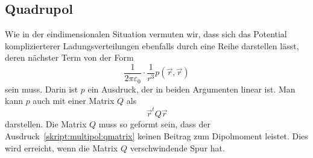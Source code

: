 \subsection{Quadrupol}
Wie in der eindimensionalen Situation vermuten wir, dass sich
das Potential komplizierterer Ladungsverteilungen ebenfalls durch
eine Reihe darstellen lässt, deren nächster Term von der Form
\[
\frac1{2\pi\varepsilon_0}\cdot\frac{1}{r^3} p(\vec{r},\vec{r})
\]
sein muss.
Darin ist $p$ ein Ausdruck, der in beiden Argumenten linear ist.
Man kann $p$ auch mit einer Matrix $Q$ als
\begin{equation}
\vec{r}^t Q\vec{r}
\label{skript:multipol:qmatrix}
\end{equation}
darstellen.
Die Matrix $Q$ muss so geformt sein, dass der
Ausdruck~\eqref{skript:multipol:qmatrix}
keinen Beitrag zum Dipolmoment leistet.
Dies wird erreicht, wenn die Matrix $Q$ verschwindende Spur hat.






